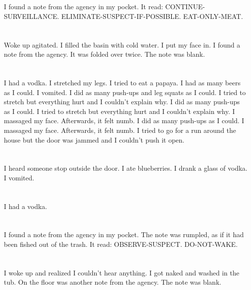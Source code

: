 \documentclass{article}
\begin{document}
    \section{}
    I found a note from the agency in my pocket. It read: CONTINUE-SURVEILLANCE. ELIMINATE-SUSPECT-IF-POSSIBLE. EAT-ONLY-MEAT.  
    \newpage
    
    \section{}
    Woke up agitated. I filled the basin with cold water. I put my face in. I found a note from the agency. It was folded over twice. The note was blank.  
    \newpage
    
    \section{}
    I had a vodka. I stretched my legs. I tried to eat a papaya. I had as many beers as I could. I vomited.  I did as many push-ups and leg squats as I could.  I tried to stretch but everything hurt and I couldn't explain why.  I did as many push-ups as I could.  I tried to stretch but everything hurt and I couldn't explain why.   I massaged my face. Afterwards, it felt numb.  I did as many push-ups as I could.  I massaged my face. Afterwards, it felt numb.  I tried to go for a run around the house but the door was jammed and I couldn't push it open.  
    \newpage
    
    \section{}
    I heard someone stop outside the door. I ate blueberries. I drank a glass of vodka. I vomited.  
    \newpage
    
    \section{}
    I had a vodka.  
    \newpage
    
    \section{}
    I found a note from the agency in my pocket. The note was rumpled, as if it had been fished out of the trash. It read: OBSERVE-SUSPECT. DO-NOT-WAKE.  
    \newpage
    
    \section{}
    I woke up and realized I couldn't hear anything. I got naked and washed in the tub. On the floor was another note from the agency. The note was blank.  
    \newpage
    
\end{document}
